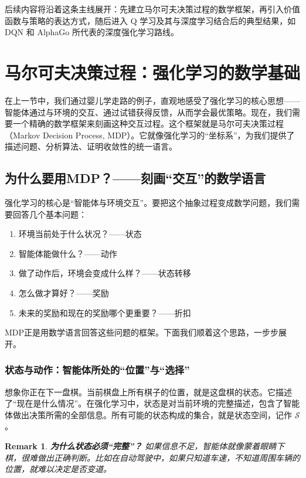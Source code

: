 \documentclass[lang=cn,zihao=-4,a4paper,fontset=windows]{beautybook}
\newtheorem*{remark}{\textbf{Remark}}
\begin{document}
后续内容将沿着这条主线展开：先建立马尔可夫决策过程的数学框架，再引入价值函数与策略的表达方式，随后进入 Q 学习及其与深度学习结合后的典型结果，如 DQN 和 AlphaGo 所代表的深度强化学习路线。

\section{马尔可夫决策过程：强化学习的数学基础}

在上一节中，我们通过婴儿学走路的例子，直观地感受了强化学习的核心思想——智能体通过与环境的交互、通过试错获得反馈，从而学会最优策略。现在，我们需要一个精确的数学框架来刻画这种交互过程。这个框架就是马尔可夫决策过程（Markov Decision Process, MDP）。它就像强化学习的“坐标系”，为我们提供了描述问题、分析算法、证明收敛性的统一语言。

\subsection{为什么要用MDP？——刻画“交互”的数学语言}

强化学习的核心是“智能体与环境交互”。要把这个抽象过程变成数学问题，我们需要回答几个基本问题：

\begin{enumerate}
    \item 环境当前处于什么状况？——状态
    \item 智能体能做什么？——动作
    \item 做了动作后，环境会变成什么样？——状态转移
    \item 怎么做才算好？——奖励
    \item 未来的奖励和现在的奖励哪个更重要？——折扣
\end{enumerate}

MDP正是用数学语言回答这些问题的框架。下面我们顺着这个思路，一步步展开。

\subsubsection{状态与动作：智能体所处的“位置”与“选择”}

想象你正在下一盘棋。当前棋盘上所有棋子的位置，就是这盘棋的状态。它描述了“现在是什么情况”。在强化学习中，状态是对当前环境的完整描述，包含了智能体做出决策所需的全部信息。所有可能的状态构成的集合，就是状态空间，记作 $\mathcal{S}$。

\begin{remark}
    \textbf{为什么状态必须“完整”？}  
    如果信息不足，智能体就像蒙着眼睛下棋，很难做出正确判断。比如在自动驾驶中，如果只知道车速，不知道周围车辆的位置，就难以决定是否变道。
\end{remark}
\end{document}
